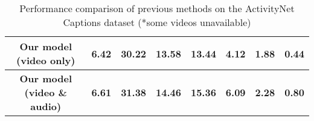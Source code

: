 \begin{table}[h]
\begin{tabular}{|c|cclllcc|}
		\textbf{Our model (video only)}                     & \multicolumn{1}{c|}{\textbf{6.42}} & \multicolumn{1}{l|}{\textbf{30.22}} & \multicolumn{1}{l|}{\textbf{13.58}} & \multicolumn{1}{l|}{\textbf{13.44}} & \multicolumn{1}{l|}{\textbf{4.12}} & \multicolumn{1}{l|}{\textbf{1.88}} & \multicolumn{1}{l|}{\textbf{0.44}} \\ \hline
		\textbf{Our model (video \& audio)}                     & \multicolumn{1}{c|}{\textbf{6.61}} & \multicolumn{1}{l|}{\textbf{31.38}} & \multicolumn{1}{l|}{\textbf{14.46}} & \multicolumn{1}{l|}{\textbf{15.36}} & \multicolumn{1}{l|}{\textbf{6.09}} & \multicolumn{1}{l|}{\textbf{2.28}} & \multicolumn{1}{l|}{\textbf{0.80}} \\ \hline
	\end{tabular}
	
	\centering
	\caption{Performance comparison of previous methods on the ActivityNet Captions dataset (*some videos unavailable)}  \label{tab: performance-comparison}
	
\end{table}

